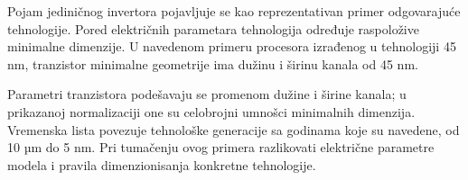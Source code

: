 Pojam jediničnog invertora pojavljuje se kao reprezentativan primer odgovarajuće tehnologije. Pored električnih parametara tehnologija određuje raspoložive minimalne dimenzije. U navedenom primeru procesora izrađenog u tehnologiji 45 nm, tranzistor minimalne geometrije ima dužinu i širinu kanala od 45 nm.

Parametri tranzistora podešavaju se promenom dužine i širine kanala; u prikazanoj normalizaciji one su celobrojni umnošci minimalnih dimenzija. Vremenska lista povezuje tehnološke generacije sa godinama koje su navedene, od 10 µm do 5 nm. Pri tumačenju ovog primera razlikovati električne parametre modela i pravila dimenzionisanja konkretne tehnologije.
